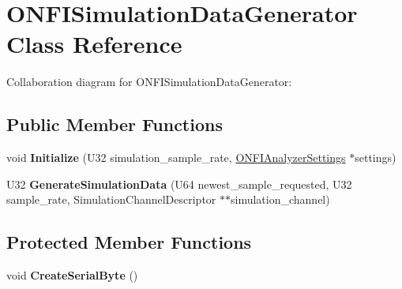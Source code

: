 \hypertarget{classONFISimulationDataGenerator}{}\section{O\+N\+F\+I\+Simulation\+Data\+Generator Class Reference}
\label{classONFISimulationDataGenerator}


Collaboration diagram for O\+N\+F\+I\+Simulation\+Data\+Generator\+:
\subsection*{Public Member Functions}
\begin{DoxyCompactItemize}
\item 
\mbox{\label{classONFISimulationDataGenerator_ab0c6832486a704eece59219eaa4138a2}} 
void {\bfseries Initialize} (U32 simulation\+\_\+sample\+\_\+rate, \hyperlink{classONFIAnalyzerSettings}{O\+N\+F\+I\+Analyzer\+Settings} $\ast$settings)
\item 
\mbox{\label{classONFISimulationDataGenerator_a00677de668ebd5c09f3ddad79d8b0da4}} 
U32 {\bfseries Generate\+Simulation\+Data} (U64 newest\+\_\+sample\+\_\+requested, U32 sample\+\_\+rate, Simulation\+Channel\+Descriptor $\ast$$\ast$simulation\+\_\+channel)
\end{DoxyCompactItemize}
\subsection*{Protected Member Functions}
\begin{DoxyCompactItemize}
\item 
\mbox{\label{classONFISimulationDataGenerator_a22084c61425879f1707e5c026ecaa8de}} 
void {\bfseries Create\+Serial\+Byte} ()
\end{DoxyCompactItemize}
